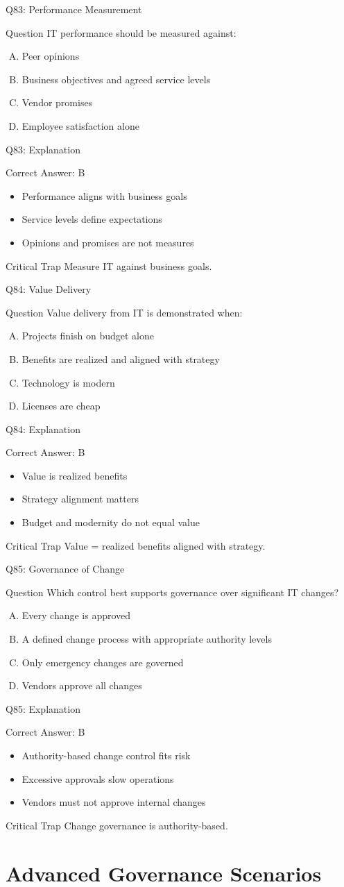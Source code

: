 \documentclass[aspectratio=169]{beamer}
\newcommand{\hq}[7]{%
	\begin{frame}{Q#1: #2}
		\begin{block}{Question}
			#3
		\end{block}
		\begin{enumerate}[(A)]
			#4
		\end{enumerate}
	\end{frame}
	\begin{frame}{Q#1: Explanation}
		\begin{block}{Correct Answer: #5}
			\begin{itemize}
				#6
			\end{itemize}
		\end{block}
		\begin{alertblock}{Critical Trap}
			#7
		\end{alertblock}
	\end{frame}
}
\begin{document}
	\hq{83}{Performance Measurement}
	{IT performance should be measured against:}
	{\item Peer opinions
		\item Business objectives and agreed service levels
		\item Vendor promises
		\item Employee satisfaction alone}
	{B}
	{\item Performance aligns with business goals
		\item Service levels define expectations
		\item Opinions and promises are not measures}
	{Measure IT against business goals.}
	
	\hq{84}{Value Delivery}
	{Value delivery from IT is demonstrated when:}
	{\item Projects finish on budget alone
		\item Benefits are realized and aligned with strategy
		\item Technology is modern
		\item Licenses are cheap}
	{B}
	{\item Value is realized benefits
		\item Strategy alignment matters
		\item Budget and modernity do not equal value}
	{Value = realized benefits aligned with strategy.}
	
	\hq{85}{Governance of Change}
	{Which control best supports governance over significant IT changes?}
	{\item Every change is approved
		\item A defined change process with appropriate authority levels
		\item Only emergency changes are governed
		\item Vendors approve all changes}
	{B}
	{\item Authority-based change control fits risk
		\item Excessive approvals slow operations
		\item Vendors must not approve internal changes}
	{Change governance is authority-based.}
	
	\section{Advanced Governance Scenarios}
	
\end{document}
